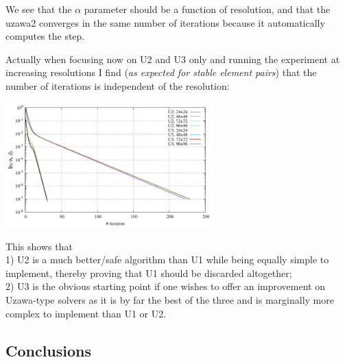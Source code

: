 We see that the $\alpha$ parameter should be a function of resolution, and that 
the uzawa2 converges in the same number of iterations because it automatically 
computes the step.


Actually when focusing now on U2 and U3 only and running the experiment at increasing resolutions I find ({\it as expected for stable element pairs}) that the number of iterations is independent of the resolution:
\begin{center}
\includegraphics[width=8cm]{python_codes/fieldstone_147/RESULTS/uzawa123/convergence_uzawa23}
\end{center}



This shows that\\
1) U2 is a much better/safe algorithm than U1 while being equally simple to implement, thereby proving that U1
 should be discarded altogether; \\
2) U3 is the obvious starting point if one wishes to offer an improvement on Uzawa-type solvers as it is by far the best of the three and is marginally more complex to implement than U1 or U2.






\newpage
\subsection*{Conclusions}

